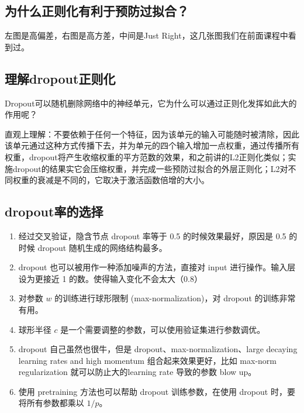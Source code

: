 \subsection{为什么正则化有利于预防过拟合？}\label{ux4e3aux4ec0ux4e48ux6b63ux5219ux5316ux6709ux5229ux4e8eux9884ux9632ux8fc7ux62dfux5408}


左图是高偏差，右图是高方差，中间是Just
Right，这几张图我们在前面课程中看到过。

\subsection{理解dropout正则化}\label{ux7406ux89e3dropoutux6b63ux5219ux5316}

​
Dropout可以随机删除网络中的神经单元，它为什么可以通过正则化发挥如此大的作用呢？

​
直观上理解：不要依赖于任何一个特征，因为该单元的输入可能随时被清除，因此该单元通过这种方式传播下去，并为单元的四个输入增加一点权重，通过传播所有权重，dropout将产生收缩权重的平方范数的效果，和之前讲的L2正则化类似；实施dropout的结果实它会压缩权重，并完成一些预防过拟合的外层正则化；L2对不同权重的衰减是不同的，它取决于激活函数倍增的大小。

\subsection{dropout率的选择}\label{dropoutux7387ux7684ux9009ux62e9}

\begin{enumerate}
\def\labelenumi{\arabic{enumi}.}
 
\item
  经过交叉验证，隐含节点 dropout 率等于 0.5 的时候效果最好，原因是 0.5
  的时候 dropout 随机生成的网络结构最多。
\item
  dropout 也可以被用作一种添加噪声的方法，直接对 input
  进行操作。输入层设为更接近 1 的数。使得输入变化不会太大（0.8）
\item
  对参数 $ w $ 的训练进行球形限制 (max-normalization)，对 dropout
  的训练非常有用。
\item
  球形半径 $ c $ 是一个需要调整的参数，可以使用验证集进行参数调优。
\item
  dropout 自己虽然也很牛，但是 dropout、max-normalization、large
  decaying learning rates and high momentum 组合起来效果更好，比如
  max-norm regularization 就可以防止大的learning rate 导致的参数 blow
  up。
\item
  使用 pretraining 方法也可以帮助 dropout 训练参数，在使用 dropout
  时，要将所有参数都乘以 $ 1/p $。
\end{enumerate}

